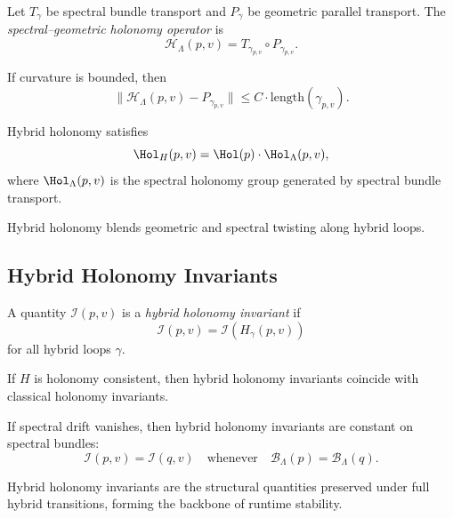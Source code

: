 \begin{definition}
Let $T_{\gamma}$ be spectral bundle transport and $P_{\gamma}$ be geometric
parallel transport.  
The \emph{spectral--geometric holonomy operator} is
\[
\mathcal{H}_{\Lambda}(p,v)
= T_{\gamma_{p,v}} \circ P_{\gamma_{p,v}}.
\]
\end{definition}

\begin{lemma}
If curvature is bounded, then
\[
\| \mathcal{H}_{\Lambda}(p,v) - P_{\gamma_{p,v}} \|
\le C \cdot \mathrm{length}(\gamma_{p,v}).
\]
\end{lemma}

\begin{theorem}
Hybrid holonomy satisfies
\[
\Hol_H(p,v)
= \Hol(p) \cdot \Hol_{\Lambda}(p,v),
\]
where $\Hol_{\Lambda}(p,v)$ is the spectral holonomy group generated by
spectral bundle transport.
\end{theorem}

\begin{remark}
Hybrid holonomy blends geometric and spectral twisting along hybrid loops.
\end{remark}

\subsection{Hybrid Holonomy Invariants}

\begin{definition}
A quantity $\mathcal{I}(p,v)$ is a \emph{hybrid holonomy invariant} if
\[
\mathcal{I}(p,v) = \mathcal{I}(H_{\gamma}(p,v))
\]
for all hybrid loops $\gamma$.
\end{definition}

\begin{lemma}
If $H$ is holonomy consistent, then hybrid holonomy invariants coincide
with classical holonomy invariants.
\end{lemma}

\begin{theorem}
If spectral drift vanishes, then hybrid holonomy invariants are constant
on spectral bundles:
\[
\mathcal{I}(p,v) = \mathcal{I}(q,v)
\quad\text{whenever}\quad
\mathcal{B}_\Lambda(p) = \mathcal{B}_\Lambda(q).
\]
\end{theorem}

\begin{remark}
Hybrid holonomy invariants are the structural quantities preserved under
full hybrid transitions, forming the backbone of runtime stability.
\end{remark}
